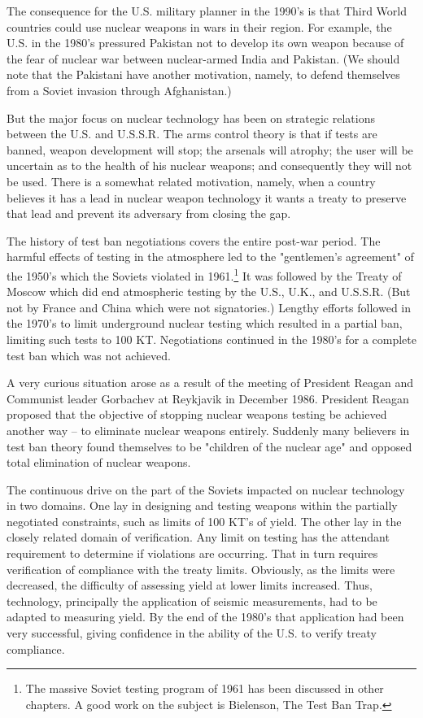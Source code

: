 The consequence for the U.S. military planner in the 1990's is that Third World countries could use nuclear weapons in wars in their region. For example, the U.S. in the 1980's pressured Pakistan not to develop its own weapon because of the fear of nuclear war between nuclear-armed India and Pakistan. (We should note that the Pakistani have another motivation, namely, to defend themselves from a Soviet invasion through Afghanistan.)

But the major focus on nuclear technology has been on strategic relations between the U.S. and U.S.S.R. The arms control theory is that if tests are banned, weapon development will stop; the arsenals will atrophy; the user will be uncertain as to the health of his nuclear weapons; and consequently they will not be used. There is a somewhat related motivation, namely, when a country believes it has a lead in nuclear weapon technology it wants a treaty to preserve that lead and prevent its adversary from closing the gap.

The history of test ban negotiations covers the entire post-war period. The harmful effects of testing in the atmosphere led to the "gentlemen's agreement" of the 1950's which the Soviets violated in 1961.\footnote{
The massive Soviet testing program of 1961 has been discussed in other chapters. A good work on the subject is Bielenson, The Test Ban Trap.}  It was followed by the Treaty of Moscow which did end atmospheric testing by the U.S., U.K., and U.S.S.R. (But not by France and China which were not signatories.) Lengthy efforts followed in the 1970's to limit underground nuclear testing which resulted in a partial ban, limiting such tests to 100 KT. Negotiations continued in the 1980's for a complete test ban which was not achieved.

A very curious situation arose as a result of the meeting of President Reagan and Communist leader Gorbachev at Reykjavik in December 1986. President Reagan proposed that the objective of stopping nuclear weapons testing be achieved another way -- to eliminate nuclear weapons entirely. Suddenly many believers in test ban theory found themselves to be "children of the nuclear age" and opposed total elimination of nuclear weapons.

The continuous drive on the part of the Soviets impacted on nuclear technology in two domains. One lay in designing and testing weapons within the partially negotiated constraints, such as limits of 100 KT's of yield. The other lay in the closely related domain of verification. Any limit on testing has the attendant requirement to determine if violations are occurring. That in turn requires verification of compliance with the treaty limits. Obviously, as the limits were decreased, the difficulty of assessing yield at lower limits increased. Thus, technology, principally the application of seismic measurements, had to be adapted to measuring yield. By the end of the 1980's that application had been very successful, giving confidence in the ability of the U.S. to verify treaty compliance.

